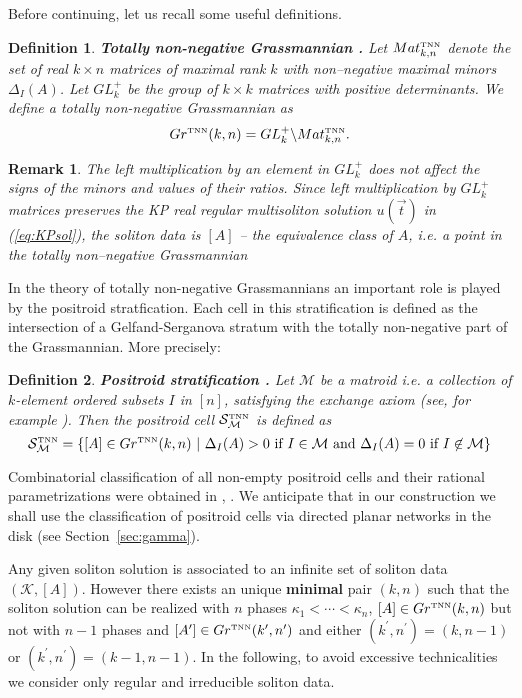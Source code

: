 \documentclass[11pt]{amsart}
\theoremstyle{plain}
\numberwithin{equation}{section}
\newtheorem{remark}{Remark}[subsection]
\newtheorem{definition}{Definition}[subsection]
\def \GTNN {{Gr^{\mbox{\tiny TNN}} (k,n)}}
\def \S {{\mathcal S}_{\mathcal M}^{\mbox{\tiny TNN}}}
\begin{document}
Before continuing, let us recall some useful definitions.

\begin{definition}\textbf{Totally non-negative Grassmannian \cite{Pos}.}
Let $Mat^{\mbox{\tiny TNN}}_{k,n}$ denote the set of real $k\times n$ matrices of maximal rank $k$ with non--negative maximal minors $\Delta_I (A)$. Let $GL_k^+$ be the group of $k\times k$ matrices with positive determinants. We define a totally non-negative Grassmannian as 
\[
\GTNN = GL_k^+ \backslash Mat^{\mbox{\tiny TNN}}_{k,n}.
\]
\end{definition}

\begin{remark}
The left multiplication by an element in  $GL_k^+$ does not affect the signs of the minors and values of their ratios. Since left multiplication by $GL_k^+$ matrices preserves the KP real regular multisoliton solution $u({\vec t})$ in (\ref{eq:KPsol}), the soliton data is $[A]$ -- the equivalence class of $A$,  {\sl i.e.} a point in the totally non--negative Grassmannian 
\end{remark}

In the theory of totally non-negative Grassmannians an important role is played by the positroid stratfication. Each cell in this stratification is defined as the intersection of a Gelfand-Serganova stratum \cite{GS,GGMS} with the totally non-negative part of the Grassmannian. More precisely:
\begin{definition}\textbf{Positroid stratification \cite{Pos}.} Let $\mathcal M$ be a matroid i.e. a collection of $k$-element ordered subsets $I$ in $[n]$, satisfying the exchange axiom (see, for example \cite{GS,GGMS}). Then the positroid cell $\S$ is defined as
$$
\S=\{[A]\in \GTNN\ | \ \Delta_{I}(A) >0 \ \mbox{if}\ I\in{\mathcal M} \ \mbox{and} \  \Delta_{I}(A) = 0 \ \mbox{if} \ I\not\in{\mathcal M}  \}
$$
\end{definition}
Combinatorial classification of all non-empty positroid cells and their rational parametrizations were obtained in \cite{Pos}, \cite{Tal2}. We anticipate that in our construction we shall use the classification of positroid cells via directed planar networks in the disk (see Section~\ref{sec:gamma}).

Any given soliton solution is associated to an infinite set of soliton data $({\mathcal K}, [A])$. However there exists an unique \textbf{minimal} pair $(k,n)$ such that the soliton solution can be realized with $n$ phases $\kappa_1<\cdots<\kappa_n$, $[A]\in \GTNN$ but not with $n-1$ phases and $[A^\prime]\in Gr^{\mbox{\tiny TNN}} (k^{\prime},n^{\prime})$ and either $(k^{\prime}, n^{\prime}) =(k, n-1)$ or $(k^{\prime}, n^{\prime}) =(k-1, n-1)$.
In the following, to avoid excessive technicalities we consider only regular and irreducible soliton data.
\end{document}
